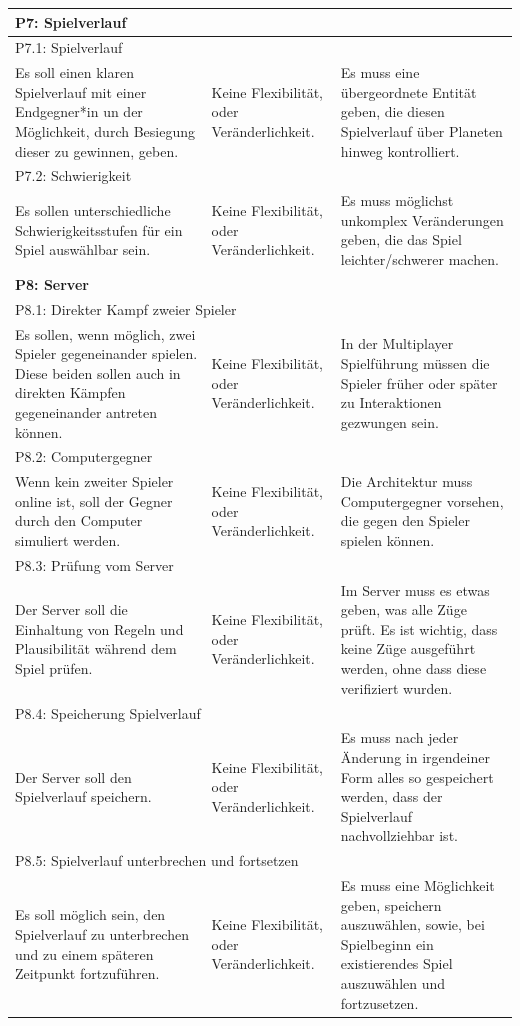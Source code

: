 \documentclass[fontsize=12pt,paper=a4,twoside]{scrartcl}
\begin{document}
\begin{longtable}[c]{|p{5cm}|p{5cm}|p{5cm}|}
%
\multicolumn{3}{|l|}{{\textbf{P7: Spielverlauf}}} 
\\ \hline
\multicolumn{3}{|l|}{{P7.1: Spielverlauf}} 
\\ \hline
Es soll einen klaren Spielverlauf mit einer Endgegner*in un der Möglichkeit, durch Besiegung dieser zu gewinnen, geben.  & Keine Flexibilität, oder Veränderlichkeit.    & Es muss eine übergeordnete Entität geben, die diesen Spielverlauf über Planeten hinweg kontrolliert. 
\\ \hline
\multicolumn{3}{|l|}{{P7.2: Schwierigkeit}} 
\\ \hline
Es sollen unterschiedliche Schwierigkeitsstufen für ein Spiel auswählbar sein. & Keine Flexibilität, oder Veränderlichkeit.    & Es muss möglichst unkomplex Veränderungen geben, die das Spiel leichter/schwerer machen. 
\\ \hline
%
\multicolumn{3}{|l|}{{\textbf{P8: Server}}} 
\\ \hline
\multicolumn{3}{|l|}{{P8.1: Direkter Kampf zweier Spieler}} 
\\ \hline
Es sollen, wenn möglich, zwei Spieler gegeneinander spielen. Diese beiden sollen auch in direkten Kämpfen gegeneinander antreten können. & Keine Flexibilität, oder Veränderlichkeit.  & In der Multiplayer Spielführung müssen die Spieler früher oder später zu Interaktionen gezwungen sein. 
\\ \hline
\multicolumn{3}{|l|}{{P8.2: Computergegner}} 
\\ \hline
Wenn kein zweiter Spieler online ist, soll der Gegner durch den Computer simuliert werden. & Keine Flexibilität, oder Veränderlichkeit.    & Die Architektur muss Computergegner vorsehen, die gegen den Spieler spielen können. 
\\ \hline
\multicolumn{3}{|l|}{{P8.3: Prüfung vom Server}} 
\\ \hline
Der Server soll die Einhaltung von Regeln und Plausibilität während dem Spiel prüfen.  & Keine Flexibilität, oder Veränderlichkeit.    & Im Server muss es etwas geben, was alle Züge prüft. Es ist wichtig, dass keine Züge ausgeführt werden, ohne dass diese verifiziert wurden. 
\\ \hline
\multicolumn{3}{|l|}{{P8.4: Speicherung Spielverlauf}} 
\\ \hline
Der Server soll den Spielverlauf speichern. & Keine Flexibilität, oder Veränderlichkeit.    & Es muss nach jeder Änderung in irgendeiner Form alles so gespeichert werden, dass der Spielverlauf nachvollziehbar ist. 
\\ \hline
\multicolumn{3}{|l|}{{P8.5: Spielverlauf unterbrechen und fortsetzen}} 
\\ \hline
Es soll möglich sein, den Spielverlauf zu unterbrechen und zu einem späteren Zeitpunkt fortzuführen. & Keine Flexibilität, oder Veränderlichkeit.    & Es muss eine Möglichkeit geben, speichern auszuwählen, sowie, bei Spielbeginn ein existierendes Spiel auszuwählen und fortzusetzen. 
\\ \hline
\end{longtable}
\end{document}
